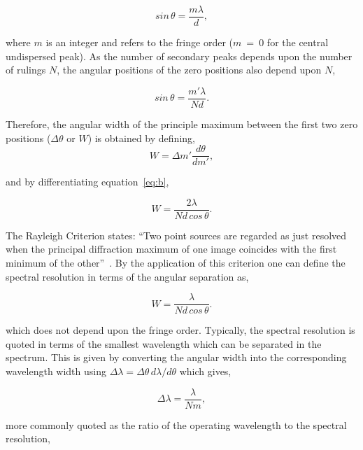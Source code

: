 \begin{equation}
    sin\,\theta = \frac{m\lambda}{d},\label{eq:a}
\end{equation}

\noindent where $m$ is an integer and refers to the fringe order ($m$~=~0 for the central undispersed peak).
As the number of secondary peaks depends upon the number of rulings $N$, the angular positions of the zero positions also depend upon $N$,

\begin{equation}
    sin\,\theta = \frac{m'\lambda}{Nd}.\label{eq:b}
\end{equation}

\noindent Therefore, the angular width of the principle maximum between the first two zero positions ($\Delta\theta$ or $W$) is obtained by defining,
\begin{equation}
     W = \Delta m'\frac{d\theta}{dm'},\label{eq:c}
\end{equation}

\noindent and by differentiating equation~\ref{eq:b},

\begin{equation}
    W = \frac{2\lambda}{Nd\,cos\,\theta}.\label{eq:d}
\end{equation}

\noindent The Rayleigh Criterion states: ``Two point sources are regarded as just resolved when the principal diffraction maximum of one image coincides with the first minimum of the other''~\citep{1880MNRAS..40..254R}.
By the application of this criterion one can define the spectral resolution in terms of the angular separation as,

\begin{equation}
    W = \frac{\lambda}{Nd\,cos\,\theta}.\label{eq:e}
\end{equation}

\noindent which does not depend upon the fringe order.
Typically, the spectral resolution is quoted in terms of the smallest wavelength which can be separated in the spectrum.
This is given by converting the angular width into the corresponding wavelength width using $\Delta\lambda = \Delta\theta\,d\lambda/d\theta$ which gives,

\begin{equation}
    \Delta\lambda = \frac{\lambda}{Nm},\label{eq:f}
\end{equation}

\noindent more commonly quoted as the ratio of the operating wavelength to the spectral resolution,

